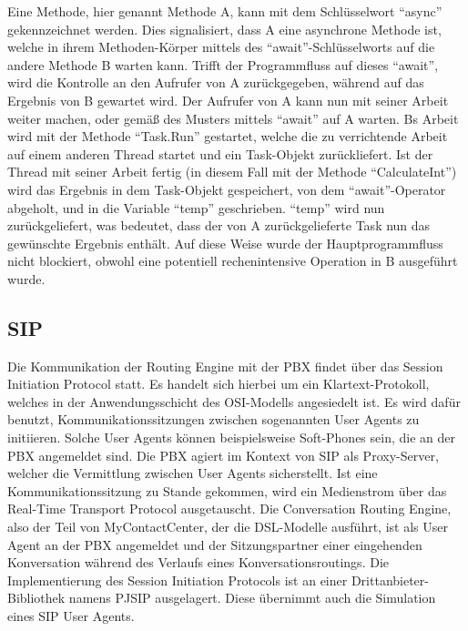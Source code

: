 Eine Methode, hier genannt Methode A, kann mit dem Schlüsselwort ``async'' gekennzeichnet werden. Dies signalisiert, dass A eine asynchrone Methode ist, welche in ihrem Methoden-Körper mittels des ``await''-Schlüsselworts auf die andere Methode B warten kann. Trifft der Programmfluss auf dieses ``await'', wird die Kontrolle an den Aufrufer von A zurückgegeben, während auf das Ergebnis von B gewartet wird. Der Aufrufer von A kann nun mit seiner Arbeit weiter machen, oder gemäß des Musters mittels ``await'' auf A warten. Bs Arbeit wird mit der Methode ``Task.Run'' gestartet, welche die zu verrichtende Arbeit auf einem anderen Thread startet und ein Task-Objekt zurückliefert. Ist der Thread mit seiner Arbeit fertig (in diesem Fall mit der Methode ``CalculateInt'') wird das Ergebnis in dem Task-Objekt gespeichert, von dem ``await''-Operator abgeholt, und in die Variable ``temp'' geschrieben. ``temp'' wird nun zurückgeliefert, was bedeutet, dass der von A zurückgelieferte Task nun das gewünschte Ergebnis enthält. Auf diese Weise wurde der Hauptprogrammfluss nicht blockiert, obwohl eine potentiell rechenintensive Operation in B ausgeführt wurde.



\subsection{SIP}
Die Kommunikation der Routing Engine mit der PBX findet über das Session Initiation Protocol statt. Es handelt sich hierbei um ein Klartext-Protokoll, welches in der Anwendungsschicht des OSI-Modells angesiedelt ist. Es wird dafür benutzt, Kommunikationssitzungen zwischen sogenannten User Agents zu initiieren. Solche User Agents können beispielsweise Soft-Phones sein, die an der PBX angemeldet sind. Die PBX agiert im Kontext von SIP als Proxy-Server, welcher die Vermittlung zwischen User Agents sicherstellt. Ist eine Kommunikationssitzung zu Stande gekommen, wird ein Medienstrom über das Real-Time Transport Protocol ausgetauscht. Die Conversation Routing Engine, also der Teil von MyContactCenter, der die DSL-Modelle ausführt, ist als User Agent an der PBX angemeldet und der Sitzungspartner einer eingehenden Konversation während des Verlaufs eines Konversationsroutings. Die Implementierung des Session Initiation Protocols ist an einer Drittanbieter-Bibliothek namens PJSIP ausgelagert. Diese übernimmt auch die Simulation eines SIP User Agents. 